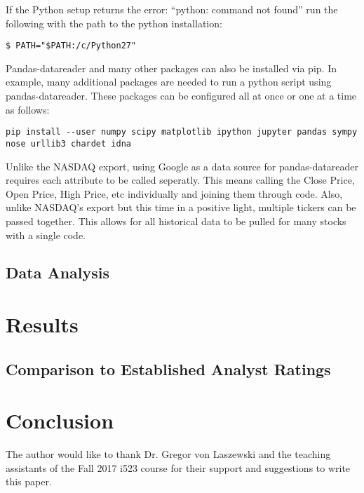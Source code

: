 \documentclass[sigconf]{acmart}
\begin{document}
If the Python setup returns the error: ``python: command not found'' run the following with the path to the python installation:
\begin{mdframed}[style=default]
\begin{lstlisting}
$ PATH="$PATH:/c/Python27"
\end{lstlisting}
\end{mdframed}

Pandas-datareader and many other packages can also be installed via pip. In example, many additional packages are needed to run a python script using pandas-datareader. These packages can be configured all at once or one at a time as follows:
\begin{mdframed}[style=default]
\begin{lstlisting}
pip install --user numpy scipy matplotlib ipython jupyter pandas sympy nose urllib3 chardet idna
\end{lstlisting}
\end{mdframed}

Unlike the NASDAQ export, using Google as a data source for pandas-datareader requires each attribute to be called seperatly. This means calling the Close Price, Open Price, High Price, etc individually and joining them through code. Also, unlike NASDAQ's export but this time in a positive light, multiple tickers can be passed together. This allows for all historical data to be pulled for many stocks with a single code. 






\subsection{Data Analysis}



\section{Results}

\subsection{Comparison to Established Analyst Ratings}


\section{Conclusion}


\begin{acks}

The author would like to thank Dr. Gregor von Laszewski and the teaching assistants of the Fall 2017 i523 course for their support and suggestions to write this paper.

\end{acks}


 
\end{document}
